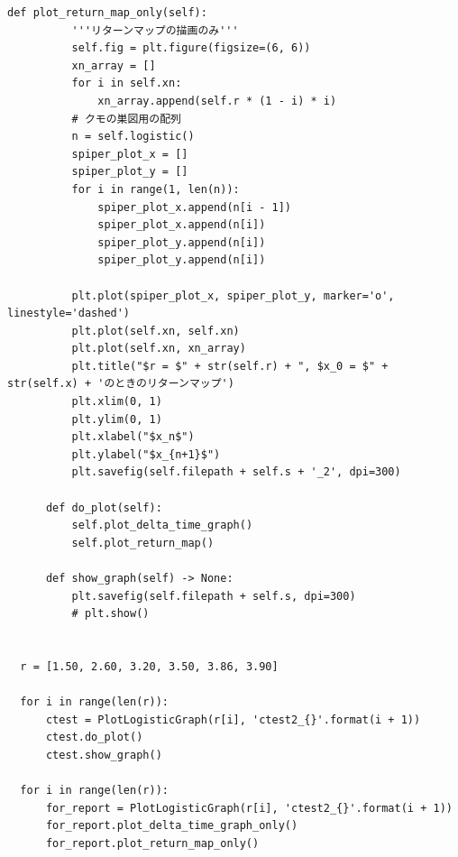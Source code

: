 \begin{lstlisting}[caption=week1.py]
      def plot_return_map_only(self):
          '''リターンマップの描画のみ'''
          self.fig = plt.figure(figsize=(6, 6))
          xn_array = []
          for i in self.xn:
              xn_array.append(self.r * (1 - i) * i)
          # クモの巣図用の配列
          n = self.logistic()
          spiper_plot_x = []
          spiper_plot_y = []
          for i in range(1, len(n)):
              spiper_plot_x.append(n[i - 1])
              spiper_plot_x.append(n[i])
              spiper_plot_y.append(n[i])
              spiper_plot_y.append(n[i])
          
          plt.plot(spiper_plot_x, spiper_plot_y, marker='o', linestyle='dashed')
          plt.plot(self.xn, self.xn)
          plt.plot(self.xn, xn_array)
          plt.title("$r = $" + str(self.r) + ", $x_0 = $" + str(self.x) + 'のときのリターンマップ')
          plt.xlim(0, 1)
          plt.ylim(0, 1)
          plt.xlabel("$x_n$")
          plt.ylabel("$x_{n+1}$")
          plt.savefig(self.filepath + self.s + '_2', dpi=300)

      def do_plot(self):
          self.plot_delta_time_graph()
          self.plot_return_map()

      def show_graph(self) -> None:
          plt.savefig(self.filepath + self.s, dpi=300)
          # plt.show()


  r = [1.50, 2.60, 3.20, 3.50, 3.86, 3.90]

  for i in range(len(r)):
      ctest = PlotLogisticGraph(r[i], 'ctest2_{}'.format(i + 1))
      ctest.do_plot()
      ctest.show_graph()

  for i in range(len(r)):
      for_report = PlotLogisticGraph(r[i], 'ctest2_{}'.format(i + 1))
      for_report.plot_delta_time_graph_only()
      for_report.plot_return_map_only()
\end{lstlisting}